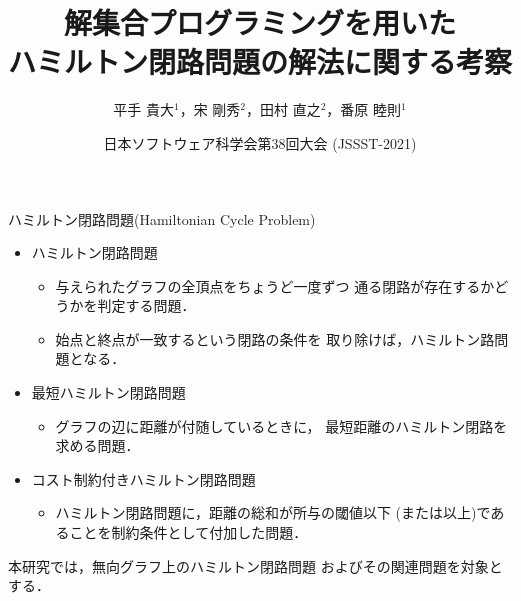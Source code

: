 \documentclass[dvipdfmx,10pt]{beamer}
\title{解集合プログラミングを用いた\\ハミルトン閉路問題の解法に関する考察}
\author{平手 貴大$^1$，宋 剛秀$^2$，田村 直之$^2$，番原 睦則$^1$}
\date{日本ソフトウェア科学会第38回大会 (JSSST-2021)}
\institute{1.名古屋大学 大学院情報学研究科 \\ 2.神戸大学 情報基盤センター}
\begin{document}
\frame{\maketitle}
\begin{frame}{ハミルトン閉路問題(Hamiltonian Cycle Problem)}
  \begin{itemize}
  \item \alert{ハミルトン閉路問題}
    \begin{itemize}
    \item 与えられたグラフの全頂点をちょうど一度ずつ
      通る閉路が存在するかどうかを判定する問題．
    \item 始点と終点が一致するという閉路の条件を
      取り除けば，ハミルトン路問題となる．
    \end{itemize}
  \item \alert{最短ハミルトン閉路問題}
    \begin{itemize}
    \item グラフの辺に距離が付随しているときに，
      最短距離のハミルトン閉路を求める問題．
    \end{itemize}
  \item \alert{コスト制約付きハミルトン閉路問題}
    \begin{itemize}
    \item ハミルトン閉路問題に，距離の総和が所与の閾値以下
      (または以上)であることを制約条件として付加した問題．
    \end{itemize}
  \end{itemize}
  \begin{alertblock}{}
    本研究では，無向グラフ上のハミルトン閉路問題
    およびその関連問題を対象とする．    
  \end{alertblock}
\end{frame}
\end{document}
